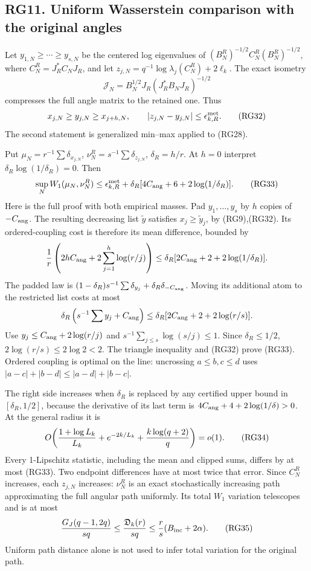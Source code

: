 \documentclass[11pt]{article}
\begin{document}
\subsection{RG11. Uniform Wasserstein comparison with the original angles}\label{rg11.-uniform-wasserstein-comparison-with-the-original-angles}

Let \(y_{1,N}\ge\cdots\ge y_{s,N}\) be the centered log eigenvalues of \((B_N^R)^{-1/2}C_N^R(B_N^R)^{-1/2}\), where \(C_N^R=J_R^*C_NJ_R\), and let \(z_{j,N}=q^{-1}\log\lambda_j(C_N^R)+2\ell_k\). The exact isometry \[
\mathcal J_N=B_N^{1/2}J_R(J_R^*B_NJ_R)^{-1/2}
\] compresses the full angle matrix to the retained one. Thus \[
x_{j,N}\ge y_{j,N}\ge x_{j+h,N},\qquad
|z_{j,N}-y_{j,N}|\le\epsilon_{k,R}^{\rm met}.
\tag{RG32}
\] The second statement is generalized min--max applied to (RG28).

Put \(\mu_N=r^{-1}\sum\delta_{x_{j,N}}\), \(\nu_N^R=s^{-1}\sum\delta_{z_{j,N}}\), \(\delta_R=h/r\). At \(h=0\) interpret \(\delta_R\log(1/\delta_R)=0\). Then \[
\sup_N W_1(\mu_N,\nu_N^R)
\le\epsilon_{k,R}^{\rm met}
+\delta_R[4C_{\rm ang}+6+2\log(1/\delta_R)].
\tag{RG33}
\] Here is the full proof with both empirical masses. Pad \(y_1,\ldots,y_s\) by \(h\) copies of \(-C_{\rm ang}\). The resulting decreasing list \(\widetilde y\) satisfies \(x_j\ge\widetilde y_j\), by (RG9),(RG32). Its ordered-coupling cost is therefore its mean difference, bounded by \[
{1\over r}\left(2hC_{\rm ang}+2\sum_{j=1}^h\log(r/j)\right)
\le\delta_R[2C_{\rm ang}+2+2\log(1/\delta_R)].
\] The padded law is \((1-\delta_R)s^{-1}\sum\delta_{y_j}+\delta_R\delta_{-C_{\rm ang}}\). Moving its additional atom to the restricted list costs at most \[
\delta_R\left(s^{-1}\sum y_j+C_{\rm ang}\right)
\le\delta_R[2C_{\rm ang}+2+2\log(r/s)].
\] Use \(y_j\le C_{\rm ang}+2\log(r/j)\) and \(s^{-1}\sum_{j\le s}\log(s/j)\le1\). Since \(\delta_R\le1/2\), \(2\log(r/s)\le2\log2<2\). The triangle inequality and (RG32) prove (RG33). Ordered coupling is optimal on the line: uncrossing \(a\le b,c\le d\) uses \(|a-c|+|b-d|\le|a-d|+|b-c|\).

The right side increases when \(\delta_R\) is replaced by any certified upper bound in \([\delta_R,1/2]\), because the derivative of its last term is \(4C_{\rm ang}+4+2\log(1/\delta)>0\). At the general radius it is \[
O\!\left({1+\log L_k\over L_k}+e^{-2k/L_k}
+{k\log(q+2)\over q}\right)=o(1).
\tag{RG34}
\] Every 1-Lipschitz statistic, including the mean and clipped sums, differs by at most (RG33). Two endpoint differences have at most twice that error. Since \(C_N^R\) increases, each \(z_{j,N}\) increases: \(\nu_N^R\) is an exact stochastically increasing path approximating the full angular path uniformly. Its total \(W_1\) variation telescopes and is at most \[
{G_J(q-1,2q)\over sq}\le{\mathfrak D_k(r)\over sq}
\le{r\over s}(B_{\rm inc}+2\alpha).
\tag{RG35}
\] Uniform path distance alone is not used to infer total variation for the original path.
\end{document}
